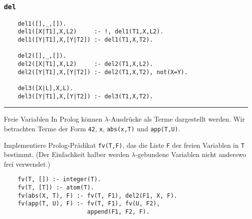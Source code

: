 \documentclass{beamer}
\begin{document}
\begin{frame}[fragile]
  \frametitle{\lstinline{del}}
  \begin{lstlisting}
    del1([],_,[]).
    del1([X|T1],X,L2)     :- !, del1(T1,X,L2).
    del1([Y|T1],X,[Y|T2]) :- del1(T1,X,T2).
    
    del2([],_,[]).
    del2([X|T1],X,L2)     :- del2(T1,X,L2).
    del2([Y|T1],X,[Y|T2]) :- del2(T1,X,T2), not(X=Y).
    
    del3([X|L],X,L).
    del3([Y|T1],X,[Y|T2]) :- del3(T1,X,T2).
  \end{lstlisting}
  \rule{\textwidth}{1pt}

   
   
   
   
   
   
   
   
\end{frame}

\begin{frame}[fragile]{Freie Variablen}
  In Prolog können $λ$-Ausdrücke als Terme dargestellt werden.
  Wir betrachten Terme der Form \lstinline{42}, \lstinline{x}, \lstinline{abs(x,T)} und \lstinline{app(T,U)}.
  
  Implementiere Prolog-Prädikat \lstinline{fv(T,F)}, das die Liste \lstinline{F} der freien Variablen in \lstinline{T} bestimmt.
  (Der Einfachkeit halber werden $λ$-gebundene Variablen nicht anderswo frei verwendet.)
  
  \pause
  \begin{lstlisting}
    fv(T, []) :- integer(T).
    fv(T, [T]) :- atom(T).
    fv(abs(X, T), F) :- fv(T, F1), del2(F1, X, F).
    fv(app(T, U), F) :- fv(T, F1), fv(U, F2),
                        append(F1, F2, F).
  \end{lstlisting}
\end{frame}
\end{document}
